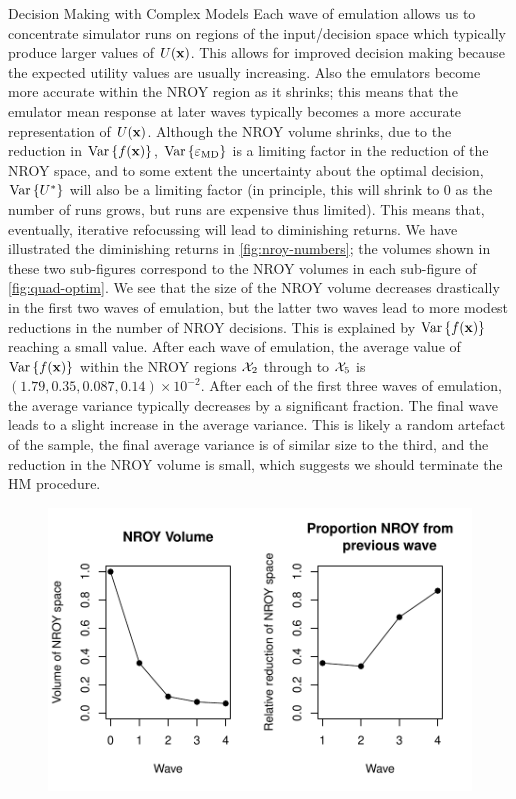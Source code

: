 \begin{chapter}{Decision Making with Complex Models \label{Chap:optimisation}}
Each wave of emulation allows us to concentrate simulator runs on regions of the input/decision space which typically produce larger values of $U(\mathbf{x})$. This allows for improved decision making because the expected utility values are usually increasing. Also the emulators become more accurate within the NROY region as it shrinks; this means that the emulator mean response at later waves typically becomes a more accurate representation of $U(\mathbf{x})$. Although the NROY volume shrinks, due to the reduction in $\mathrm{Var}\,\{f(\mathbf{x})\}$, $\mathrm{Var}\,\{\varepsilon_{\text{MD}}\}$ is a limiting factor in the reduction of the NROY space, and to some extent the uncertainty about the optimal decision, $\mathrm{Var}\,\{U^{*}\}$ will also be a limiting factor (in principle, this will shrink to $0$ as the number of runs grows, but runs are expensive thus limited). This means that, eventually, iterative refocussing will lead to diminishing returns. We have illustrated the diminishing returns in \cref{fig:nroy-numbers}; the volumes shown in these two sub-figures correspond to the NROY volumes in each sub-figure of \cref{fig:quad-optim}. We see that the size of the NROY volume decreases drastically in the first two waves of emulation, but the latter two waves lead to more modest reductions in the number of NROY decisions. This is explained by $\mathrm{Var}\,\{ f(\mathbf{x}) \}$ reaching a small value. After each wave of emulation, the average value of $\mathrm{Var}\,\{f(\mathbf{x})\}$ within the NROY regions $\mathcal{X}_2$ through to $\mathcal{X}_5$ is $(1.79, 0.35, 0.087, 0.14)\times 10^{-2}$. After each of the first three waves of emulation, the average variance typically decreases by a significant fraction. The final wave leads to a slight increase in the average variance. This is likely a random artefact of the sample, the final average variance is of similar size to the third, and the reduction in the NROY volume is small, which suggests we should terminate the HM procedure.
\begin{figure}
 \centering
 \includegraphics{fig-optim/nroy-reduction.pdf}

\end{figure}
\end{chapter}
